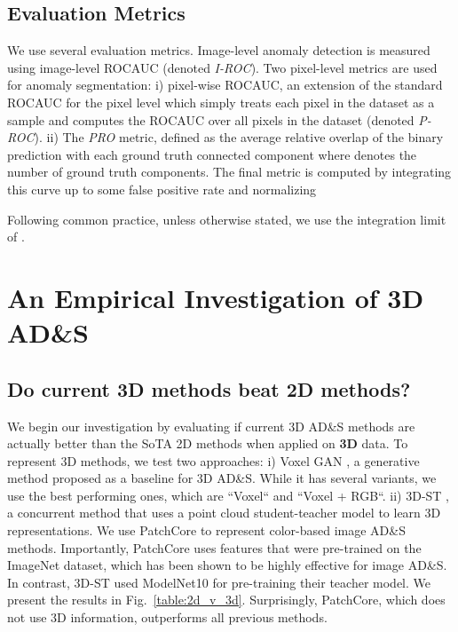 \documentclass{article}
\begin{document}
\subsection{Evaluation Metrics}
We use several evaluation metrics. Image-level anomaly detection is measured using image-level ROCAUC \cite{rocauc}  (denoted \textit{I-ROC}). Two pixel-level metrics are used for anomaly segmentation: i) pixel-wise ROCAUC, an extension of the standard ROCAUC for the pixel level which simply treats each pixel in the dataset as a sample and computes the ROCAUC over all pixels in the dataset (denoted \textit{P-ROC}). ii) The \textit{PRO} \cite{mvtec2d} metric, defined as the average relative overlap of the binary prediction  with each ground truth connected component  where  denotes the number of ground truth components. The final metric is computed by integrating this curve up to some false positive rate and normalizing



 Following common practice, unless otherwise stated, we use the integration limit of .





\section{An Empirical Investigation of 3D AD\&S}
\subsection{Do current 3D methods beat 2D methods?}
\label{sec:2d_v_3d}













We begin our investigation by evaluating if current 3D AD\&S methods are actually better than the SoTA 2D methods when applied on \textbf{3D} data. To represent 3D methods, we test two approaches: i) Voxel GAN \cite{mvtec3d}, a generative method proposed as a baseline for 3D AD\&S. While it has several variants, we use the best performing ones, which are ``Voxel`` and ``Voxel + RGB``. ii) 3D-ST \cite{3d_ad_pc_deep}, a concurrent method that uses a point cloud student-teacher model to learn 3D representations. We use PatchCore \cite{patchcore} to represent color-based image AD\&S methods. Importantly, PatchCore uses features that were pre-trained on the ImageNet \cite{imagenet} dataset, which has been shown to be highly effective for image AD\&S. In contrast, 3D-ST used ModelNet10 \cite{modelnet10} for pre-training their teacher model. We present the results in Fig.~\ref{table:2d_v_3d}. Surprisingly, PatchCore, which does not use 3D information, outperforms all previous methods.
\end{document}
